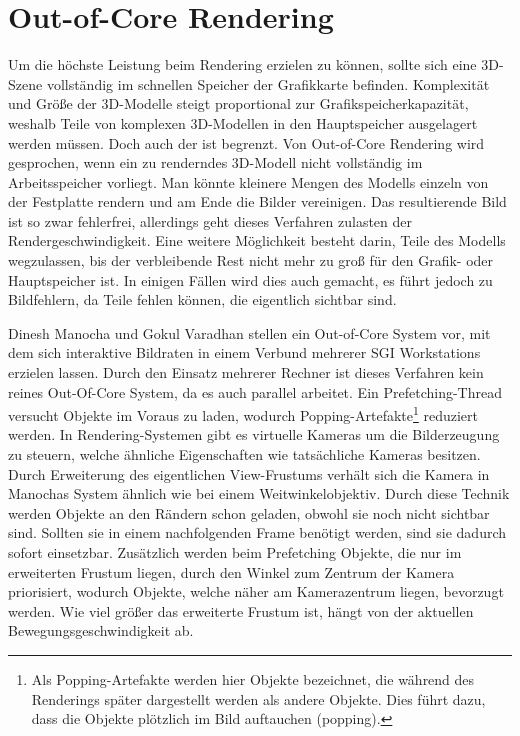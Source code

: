 \section{Out-of-Core Rendering}
\label{sec:relwork:oocrender}
Um die höchste Leistung beim Rendering erzielen zu können, sollte sich eine 3D-Szene vollständig im schnellen Speicher der Grafikkarte befinden. Komplexität und Größe der 3D-Modelle steigt proportional zur Grafikspeicherkapazität, weshalb Teile von komplexen 3D-Modellen in den Hauptspeicher ausgelagert werden müssen. Doch auch der ist begrenzt. Von Out-of-Core Rendering wird gesprochen, wenn ein zu renderndes 3D-Modell nicht vollständig im Arbeitsspeicher vorliegt. Man könnte kleinere Mengen des Modells einzeln von der Festplatte rendern und am Ende die Bilder vereinigen. Das resultierende Bild ist so zwar fehlerfrei, allerdings geht dieses Verfahren zulasten der Rendergeschwindigkeit. Eine weitere Möglichkeit besteht darin, Teile des Modells wegzulassen, bis der verbleibende Rest nicht mehr zu groß für den Grafik- oder Hauptspeicher ist. In einigen Fällen wird dies auch gemacht, es führt jedoch zu Bildfehlern, da Teile fehlen können, die eigentlich sichtbar sind.

Dinesh Manocha und Gokul Varadhan stellen ein Out-of-Core System vor, mit dem sich interaktive Bildraten in einem Verbund mehrerer SGI Workstations erzielen lassen. Durch den Einsatz mehrerer Rechner ist dieses Verfahren kein reines Out-Of-Core System, da es auch parallel arbeitet. Ein Prefetching-Thread versucht Objekte im Voraus zu laden, wodurch Popping-Artefakte\footnote{Als Popping-Artefakte werden hier Objekte bezeichnet, die während des Renderings später dargestellt werden als andere Objekte. Dies führt dazu, dass die Objekte plötzlich im Bild auftauchen (popping).} reduziert werden. In Rendering-Systemen gibt es virtuelle Kameras um die Bilderzeugung zu steuern, welche ähnliche Eigenschaften wie tatsächliche Kameras besitzen. Durch Erweiterung des eigentlichen View-Frustums verhält sich die Kamera in Manochas System ähnlich wie bei einem Weitwinkelobjektiv. Durch diese Technik werden Objekte an den Rändern schon geladen, obwohl sie noch nicht sichtbar sind. Sollten sie in einem nachfolgenden Frame benötigt werden, sind sie dadurch sofort einsetzbar. Zusätzlich werden beim Prefetching Objekte, die nur im erweiterten Frustum liegen, durch den Winkel zum Zentrum der Kamera priorisiert, wodurch Objekte, welche näher am Kamerazentrum liegen, bevorzugt werden. Wie viel größer das erweiterte Frustum ist, hängt von der aktuellen Bewegungsgeschwindigkeit ab.


